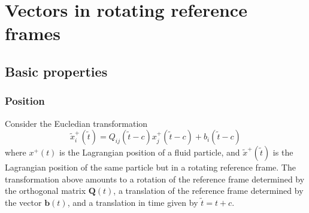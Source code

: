 \documentclass[oneside,a4paper,11pt]{report}
\begin{document}
%
\chapter{Vectors in rotating reference frames}
%

\section{Basic properties}
\subsection{Position}
Consider the Eucledian transformation
\begin{equation}
\label{eq:x_rot}
\tilde{x}^+_i(\tilde{t}) = Q_{ij}(\tilde{t}-c) x^+_j(\tilde{t}-c) + b_i(\tilde{t}-c) 
\end{equation}
where $x^+(t)$ is the Lagrangian position of a fluid particle, and $\tilde{x}^+(\tilde{t})$ is the Lagrangian position of the same particle but in a rotating reference frame. The transformation above amounts to a rotation of the reference frame determined by the orthogonal matrix $\mathbf{Q}(t)$, a translation of the reference frame determined by the vector $\mathbf{b}(t)$, and a translation in time given by $\tilde{t} = t + c$. 

\end{document}
